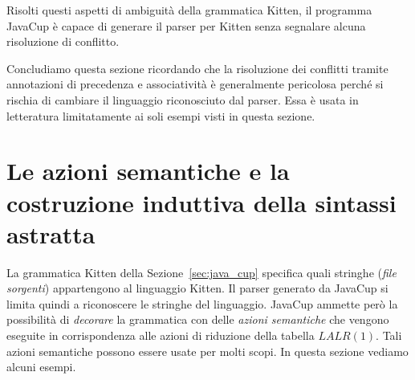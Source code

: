 Risolti questi aspetti di ambiguit\`a della grammatica Kitten, il
programma JavaCup \`e capace di generare il parser per Kitten senza
segnalare alcuna risoluzione di conflitto.

Concludiamo questa sezione ricordando che la risoluzione dei conflitti
tramite annotazioni di precedenza e associativit\`a \`e generalmente
pericolosa perch\'e si rischia di cambiare il linguaggio riconosciuto dal
parser. Essa \`e usata in letteratura limitatamente ai soli esempi visti in
questa sezione.
%
\section{Le azioni semantiche e la costruzione induttiva della sintassi astratta}\label{sec:abstract_syntax}
%
La grammatica Kitten della Sezione~\ref{sec:java_cup} specifica
quali stringhe (\emph{file sorgenti}) appartengono al linguaggio Kitten.
Il parser generato da JavaCup si limita quindi a riconoscere le stringhe
del linguaggio. JavaCup ammette per\`o la possibilit\`a di \emph{decorare}
la grammatica con delle \emph{azioni semantiche} che vengono eseguite
in corrispondenza alle azioni di riduzione della tabella $\mathit{LALR}(1)$.
Tali azioni semantiche possono essere usate per molti scopi. In questa
sezione vediamo alcuni esempi.

